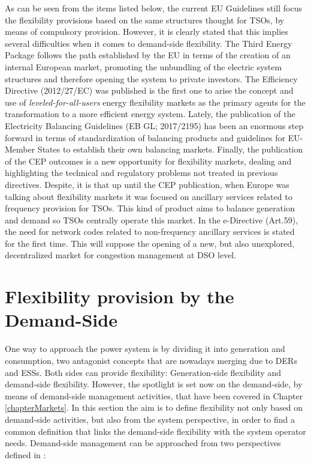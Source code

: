 As can be seen from the items listed below, the current EU Guidelines still focus the flexibility provisions based on the same structures thought for TSOs, by means of compulsory provision. However, it is clearly stated that this implies several difficulties when it comes to demand-side flexibility.
The Third Energy Package follows the path established by the EU in terms of the creation of an internal European market, promoting the unbundling of the electric system structures and therefore opening the system to private investors. The Efficiency Directive (2012/27/EC) was published is the first one to arise the concept and use of \textit{leveled-for-all-users} energy flexibility markets as the primary agents for the transformation to a more efficient energy system. Lately, the publication of the Electricity Balancing Guidelines (EB GL; 2017/2195) has been an enormous step forward in terms of standardization of balancing products and guidelines for EU-Member States to establish their own balancing markets. Finally, the publication of the CEP \cite{validzic2017clean} outcomes is a new opportunity for flexibility markets, dealing and highlighting the technical and regulatory problems not treated in previous directives. 
Despite, it is that up until the CEP publication, when Europe was talking about flexibility markets it was focused on ancillary services related to frequency provision for TSOs. This kind of product aims to balance generation and demand so TSOs centrally operate this market. In the e-Directive (Art.59), the need for network codes related to non-frequency ancillary services is stated for the first time. This will suppose the opening of a new, but also unexplored, decentralized market for congestion management at DSO level.


\section{Flexibility provision by the Demand-Side} \label{sec:FlexibilityProvision}

One way to approach the power system is by dividing it into generation and consumption, two antagonist concepts that are nowadays merging due to DERs and ESSs. Both sides can provide flexibility: Generation-side flexibility and demand-side flexibility. However, the spotlight is set now on the demand-side, by means of demand-side management activities, that have been covered in Chapter \ref{chapterMarkets}. In this section the aim is to define flexibility not only based on demand-side activities, but also from the system perspective, in order to find a common definition that links the demand-side flexibility with the system operator needs. Demand-side management can be approached from two perspectives defined in \cite{USEF2018}:

